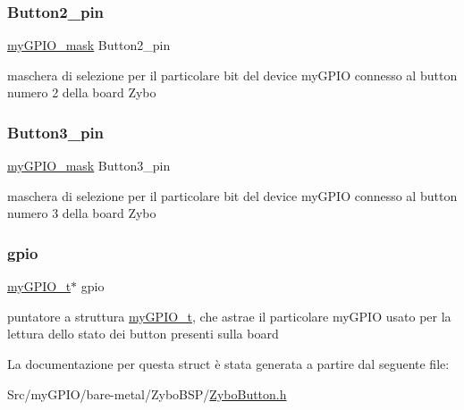 \subsubsection{\texorpdfstring{Button2\+\_\+pin}{Button2\_pin}}
{\footnotesize\ttfamily \hyperlink{group__bare-metal_ga402a0d20afc0cb7c25554b8b023f4253}{my\+G\+P\+I\+O\+\_\+mask} Button2\+\_\+pin}

maschera di selezione per il particolare bit del device my\+G\+P\+IO connesso al button numero 2 della board Zybo \mbox{\label{struct_zybo_button__t_ad462a15a55883fd4c86d2be9e11968a7}} 
\subsubsection{\texorpdfstring{Button3\+\_\+pin}{Button3\_pin}}
{\footnotesize\ttfamily \hyperlink{group__bare-metal_ga402a0d20afc0cb7c25554b8b023f4253}{my\+G\+P\+I\+O\+\_\+mask} Button3\+\_\+pin}

maschera di selezione per il particolare bit del device my\+G\+P\+IO connesso al button numero 3 della board Zybo \mbox{\label{struct_zybo_button__t_ac37ddc7c58d246d233dfb38037020184}} 
\subsubsection{\texorpdfstring{gpio}{gpio}}
{\footnotesize\ttfamily \hyperlink{structmy_g_p_i_o__t}{my\+G\+P\+I\+O\+\_\+t}$\ast$ gpio}

puntatore a struttura \hyperlink{structmy_g_p_i_o__t}{my\+G\+P\+I\+O\+\_\+t}, che astrae il particolare my\+G\+P\+IO usato per la lettura dello stato dei button presenti sulla board 

La documentazione per questa struct è stata generata a partire dal seguente file\+:\begin{DoxyCompactItemize}
\item 
Src/my\+G\+P\+I\+O/bare-\/metal/\+Zybo\+B\+S\+P/\hyperlink{_zybo_button_8h}{Zybo\+Button.\+h}\end{DoxyCompactItemize}
